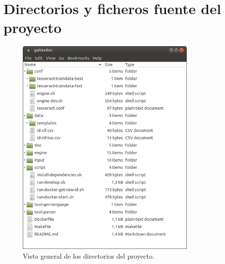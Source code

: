 
\section{Directorios y ficheros fuente del proyecto}

\begin{figure}[hp!]
    \centering
    \includegraphics[width=0.8\textwidth]{imaxes/z-adicional/estructura-general.png}
    \caption{Vista general de los directorios del proyecto.}
    \label{fig:directorios-proyecto}
\end{figure}

